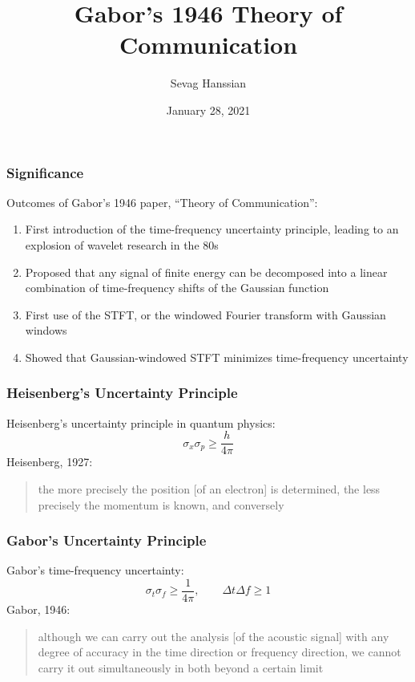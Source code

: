 \documentclass{beamer}
\title{Gabor's 1946 Theory of Communication}
\author{Sevag Hanssian}
\date{January 28, 2021}
\institute{MUMT 622, Winter 2021}
\begin{document}
\begin{frame}
\maketitle
\end{frame}

\begin{frame}
	\frametitle{Significance}
	Outcomes of Gabor's 1946 paper, ``Theory of Communication'':
	\vspace{0.5em}
	\begin{enumerate}
		\item
			First introduction of the time-frequency uncertainty principle, leading to an explosion of wavelet research in the 80s
		\item
			Proposed that any signal of finite energy can be decomposed into a linear combination of time-frequency shifts of the Gaussian function
		\item
			First use of the STFT, or the windowed Fourier transform with Gaussian windows
		\item
			Showed that Gaussian-windowed STFT minimizes time-frequency uncertainty
	\end{enumerate}
\end{frame}

\begin{frame}
	\frametitle{Heisenberg's Uncertainty Principle}
	Heisenberg's uncertainty principle in quantum physics:
	    \[ \sigma_{x}\sigma_{p} \ge \frac{h}{4\pi} \]
	    Heisenberg, 1927:
	    \begin{quote}
		    the more precisely the position [of an electron] is determined, the less precisely the momentum is known, and conversely
	    \end{quote}
\end{frame}


\begin{frame}
	\frametitle{Gabor's Uncertainty Principle}
	Gabor's time-frequency uncertainty:
	    \[ \sigma_{t}\sigma_{f} \ge \frac{1}{4\pi},\qquad\Delta t\Delta f \ge 1 \]
	    Gabor, 1946:
	    \begin{quote}
		    although we can carry out the analysis [of the acoustic signal] with any degree of accuracy in the time direction or frequency direction, we cannot carry it out simultaneously in both beyond a certain limit
	    \end{quote}
\end{frame}
\end{document}
